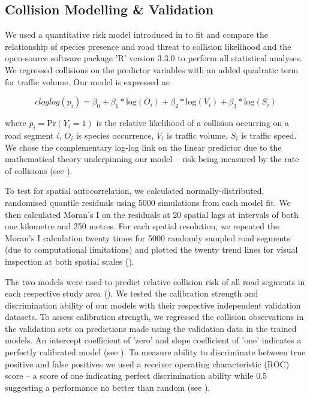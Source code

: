 \subsection{Collision Modelling \& Validation}

We used a quantitative risk model introduced in  to fit and compare the relationship of species presence and road threat to collision likelihood and the open-source software package ’R’ version 3.3.0 \citep{rdct16} to perform all statistical analyses. We regressed collisions on the predictor variables with an added quadratic term for traffic volume. Our model is expressed as:

\begin{equation} \label{eq:41}
cloglog(p_i) = \beta_0 + \beta_1*\text{log}(O_i) + \beta_2*\text{log}(V_i) + \beta_3*\text{log}(S_i)
\end{equation}

\noindent where $p_i=\text{Pr}(Y_i=1)$ is the relative likelihood of a collision occurring on a road segment $i$, $O_i$ is species occurrence, $V_i$ is traffic volume, $S_i$ is traffic speed. We chose the complementary log-log link on the linear predictor due to the mathematical theory underpinning our model -- risk being measured by the rate of collisions (see ).

To test for spatial autocorrelation, we calculated normally-distributed, randomised quantile residuals \citep{dunn96} using 5000 simulations from each model fit. We then calculated Moran's I on the residuals at 20 spatial lags at intervals of both one kilometre and 250 metres.  For each spatial resolution, we repeated the Moran's I calculation twenty times for 5000 randomly sampled road segments (due to computational limitations) and plotted the twenty trend lines for visual inspection at both spatial scales ().

The two models were used to predict relative collision risk of all road segments in each respective study area ().  We tested the calibration strength and discrimination ability of our models with their respective independent validation datasets. To assess calibration strength, we regressed the collision observations in the validation sets on predictions made using the validation data in the trained models. An intercept coefficient of 'zero' and slope coefficient of 'one' indicates a perfectly calibrated model (see \cite{mill91}). To measure ability to discriminate between true positive and false positives we used a receiver operating characteristic (ROC) score -- a score of one indicating perfect discrimination ability while 0.5 suggesting a performance no better than random (see \cite{metz78}).

